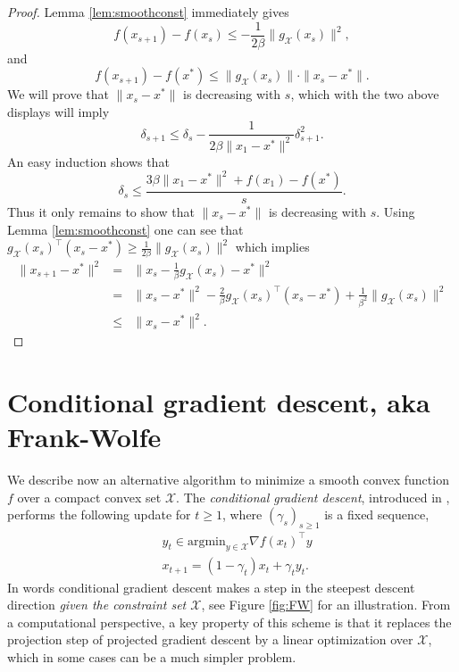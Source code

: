 \documentclass[openany]{now}
\newcommand{\cX}{\mathcal{X}}
\begin{document}
\begin{proof}
Lemma \ref{lem:smoothconst} immediately gives
$$f(x_{s+1}) - f(x_s) \leq - \frac{1}{2 \beta} \|g_{\cX}(x_s)\|^2 ,$$
and
$$f(x_{s+1}) - f(x^*) \leq \|g_{\cX}(x_s)\| \cdot \|x_s - x^*\| .$$
We will prove that $\|x_s - x^*\|$ is decreasing with $s$, which with the two above displays will imply
$$\delta_{s+1} \leq \delta_s  - \frac{1}{2 \beta \|x_1 - x^*\|^2} \delta_{s+1}^2.$$
An easy induction shows that
$$\delta_s \leq \frac{3 \beta \|x_1 - x^*\|^2 + f(x_1) - f(x^*)}{s}.$$
Thus it only remains to show that $\|x_s - x^*\|$ is decreasing with $s$. Using Lemma \ref{lem:smoothconst} one can see that $g_{\cX}(x_s)^{\top} (x_s - x^*) \geq \frac{1}{2 \beta} \|g_{\cX}(x_s)\|^2$ which implies
\begin{eqnarray*}
\|x_{s+1} - x^*\|^2& = & \|x_{s} - \frac{1}{\beta} g_{\cX}(x_s) - x^*\|^2 \\
& = & \|x_{s} - x^*\|^2 - \frac{2}{\beta} g_{\cX}(x_s)^{\top} (x_s - x^*) + \frac{1}{\beta^2} \|g_{\cX}(x_s)\|^2 \\
& \leq & \|x_{s} - x^*\|^2 .
\end{eqnarray*}
\end{proof}

\section{Conditional gradient descent, aka Frank-Wolfe} \label{sec:FW}
We describe now an alternative algorithm to minimize a smooth convex function $f$ over a compact convex set $\mathcal{X}$. The {\em conditional gradient descent}, introduced in \cite{FW56}, performs the following update for $t \geq 1$, where $(\gamma_s)_{s \geq 1}$ is a fixed sequence,
\begin{align}
&y_{t} \in \mathrm{argmin}_{y \in \mathcal{X}} \nabla f(x_t)^{\top} y \label{eq:FW1} \\
& x_{t+1} = (1 - \gamma_t) x_t + \gamma_t y_t . \label{eq:FW2}
\end{align}
In words conditional gradient descent makes a step in the steepest descent direction {\em given the constraint set $\cX$}, see Figure \ref{fig:FW} for an illustration. From a computational perspective, a key property of this scheme is that it replaces the projection step of projected gradient descent by a linear optimization over $\cX$, which in some cases can be a much simpler problem. 
\end{document}
